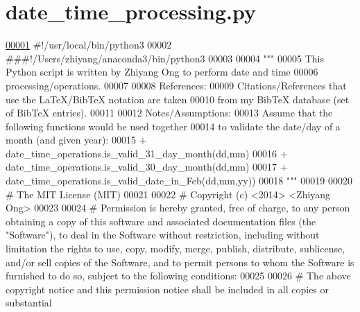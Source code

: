 \hypertarget{date__time__processing_8py_source}{}\section{date\+\_\+time\+\_\+processing.\+py}
\label{date__time__processing_8py_source}

\begin{DoxyCode}
\hypertarget{date__time__processing_8py_source_l00001}{}\hyperlink{namespaceutilities_1_1date__time__processing}{00001} \textcolor{comment}{#!/usr/local/bin/python3}
00002 \textcolor{comment}{###!/Users/zhiyang/anaconda3/bin/python3}
00003 
00004 \textcolor{stringliteral}{"""}
00005 \textcolor{stringliteral}{    This Python script is written by Zhiyang Ong to perform date and time}
00006 \textcolor{stringliteral}{        processing/operations.}
00007 \textcolor{stringliteral}{}
00008 \textcolor{stringliteral}{    References:}
00009 \textcolor{stringliteral}{    Citations/References that use the LaTeX/BibTeX notation are taken}
00010 \textcolor{stringliteral}{        from my BibTeX database (set of BibTeX entries).}
00011 \textcolor{stringliteral}{}
00012 \textcolor{stringliteral}{    Notes/Assumptions:}
00013 \textcolor{stringliteral}{    Assume that the following functions would be used together}
00014 \textcolor{stringliteral}{        to validate the date/day of a month (and given year):}
00015 \textcolor{stringliteral}{        + date\_time\_operations.is\_valid\_31\_day\_month(dd,mm)}
00016 \textcolor{stringliteral}{        + date\_time\_operations.is\_valid\_30\_day\_month(dd,mm)}
00017 \textcolor{stringliteral}{        + date\_time\_operations.is\_valid\_date\_in\_Feb(dd,mm,yy))}
00018 \textcolor{stringliteral}{"""}
00019 
00020 \textcolor{comment}{#   The MIT License (MIT)}
00021 
00022 \textcolor{comment}{#   Copyright (c) <2014> <Zhiyang Ong>}
00023 
00024 \textcolor{comment}{#   Permission is hereby granted, free of charge, to any person obtaining a copy of this software and
       associated documentation files (the "Software"), to deal in the Software without restriction, including without
       limitation the rights to use, copy, modify, merge, publish, distribute, sublicense, and/or sell copies of the
       Software, and to permit persons to whom the Software is furnished to do so, subject to the following
       conditions:}
00025 
00026 \textcolor{comment}{#   The above copyright notice and this permission notice shall be included in all copies or substantial
}
\end{DoxyCode}
